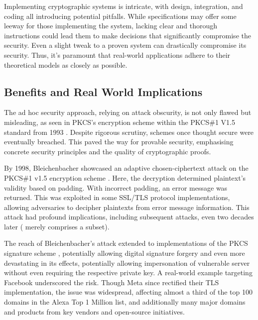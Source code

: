 \documentclass[]{final_report}
\theoremstyle{definition}
\begin{document}
Implementing cryptographic systems is intricate, with design, integration, and coding all introducing potential pitfalls. While specifications may offer some leeway for those implementing the system, lacking clear and thorough instructions could lead them to make decisions that significantly compromise the security. Even a slight tweak to a proven system can drastically compromise its security. Thus, it's paramount that real-world applications adhere to their theoretical models as closely as possible.


\subsection{Benefits and Real World Implications}
The ad hoc security approach, relying on attack obscurity, is not only flawed but misleading, as seen in PKCS's encryption scheme within the PKCS\#1 V1.5 standard from 1993 \cite{rfc2313}. Despite rigorous scrutiny, schemes once thought secure were eventually breached. This paved the way for provable security, emphasising concrete security principles and the quality of cryptographic proofs.

By 1998, Bleichenbacher showcased an adaptive chosen-ciphertext attack on the PKCS\#1 v1.5 encryption scheme \cite{bleichenbacher1998chosen}. Here, the decryption determined plaintext's validity based on padding. With incorrect padding, an error message was returned. This was exploited in some SSL/TLS protocol implementations, allowing adversaries to decipher plaintexts from error message information. This attack had profound implications, including subsequent attacks, even two decades later (\cite{coppersmith1996low, coron2000new, 10.1007/978-3-540-45238-6_33, degabriele2012joint, bardou2012efficient, meyer2014revisiting, zhang2014cross, jager2015security, jager2015practical, bock2018return} merely comprises a subset).

The reach of Bleichenbacher's attack extended to implementations of the PKCS signature scheme \cite{finney2006bleichenbacher, kuhn2008variants}, potentially allowing digital signature forgery and even more devastating in its effects, potentially allowing impersonation of vulnerable server without even requiring the respective private key. A real-world example targeting Facebook  \cite{bock2018return} underscored the risk. Though Meta since rectified their TLS implementation, the issue was widespread, affecting almost a third of the top 100 domains in the Alexa Top 1 Million list, and additionally many major domains and products from key vendors and open-source initiatives.
\end{document}
